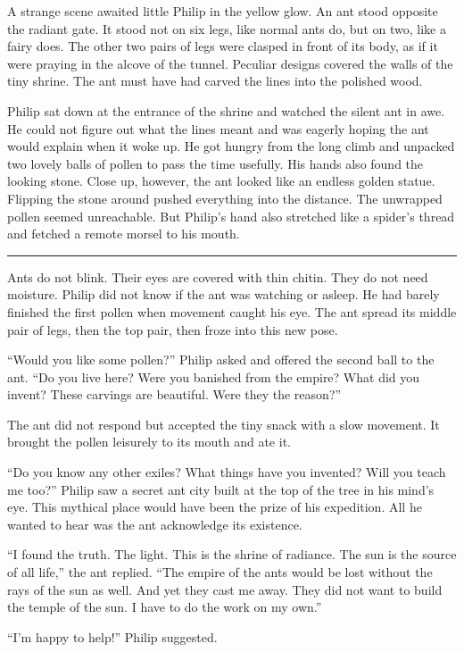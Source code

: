 \documentclass[10pt, draft]{memoir}
\renewcommand{\pfbreakdisplay}{\bigskip \ding{166} \bigskip}
\newcommand{\secbreak}{\fancybreak{\pfbreakdisplay}}
\begin{document}
A strange scene awaited little Philip in the yellow glow. An ant stood opposite
the radiant gate. It stood not on six legs, like normal ants do, but on two,
like a fairy does. The other two pairs of legs were clasped in front of its
body, as if it were praying in the alcove of the tunnel. Peculiar designs
covered the walls of the tiny shrine. The ant must have had carved the lines
into the polished wood.

Philip sat down at the entrance of the shrine and watched the silent ant in
awe. He could not figure out what the lines meant and was eagerly hoping the
ant would explain when it woke up. He got hungry from the long climb and
unpacked two lovely balls of pollen to pass the time usefully. His hands also
found the looking stone. Close up, however, the ant looked like an endless
golden statue. Flipping the stone around pushed everything into the distance.
The unwrapped pollen seemed unreachable. But Philip's hand also stretched like
a spider's thread and fetched a remote morsel to his mouth.

\secbreak

Ants do not blink. Their eyes are covered with thin chitin. They do not need
moisture. Philip did not know if the ant was watching or asleep. He had barely
finished the first pollen when movement caught his eye. The ant spread its
middle pair of legs, then the top pair, then froze into this new pose.

``Would you like some pollen?'' Philip asked and offered the second ball to the
ant. ``Do you live here? Were you banished from the empire? What did you
invent? These carvings are beautiful. Were they the reason?''

The ant did not respond but accepted the tiny snack with a slow movement. It
brought the pollen leisurely to its mouth and ate it.

``Do you know any other exiles? What things have you invented? Will you teach
me too?'' Philip saw a secret ant city built at the top of the tree in his
mind's eye. This mythical place would have been the prize of his expedition.
All he wanted to hear was the ant acknowledge its existence.

``I found the truth. The light. This is the shrine of radiance. The sun is the
source of all life,'' the ant replied. ``The empire of the ants would be lost
without the rays of the sun as well. And yet they cast me away. They did not
want to build the temple of the sun. I have to do the work on my own.''

``I'm happy to help!'' Philip suggested.
\end{document}
